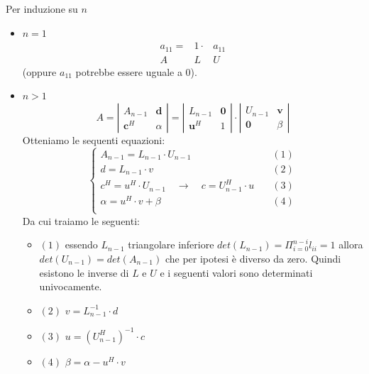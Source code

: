 \begin{thproof}
  Per induzione su $n$
  \begin{itemize}
  \item $n=1$\\
    \[\begin{array}{ccc}
      a_{11} = & 1 \cdot & a_{11} \\ 
      A        & L       & U
    \end{array}\]
    (oppure $a_{11}$ potrebbe essere uguale a $0$).
 \item $n>1$\\
\[
A = \left |
\begin{array}{c|c}
A_{n-1} & \mathbf{d} \\ \hline
\mathbf{c}^{H} &  \alpha
\end{array}
\right | = \left |
\begin{array}{c|c}
L_{n-1} & \mathbf{0} \\ \hline
\mathbf{u}^{H} &  1
\end{array}
\right |
\cdot
\left |
\begin{array}{c|c}
U_{n-1} & \mathbf{v} \\ \hline
\mathbf{0}      & \beta
\end{array}
\right |
\]
Otteniamo le sequenti equazioni:
\[\left\{
  \begin{array}{ll}
    A_{n-1} = L_{n-1} \cdot U_{n-1} & (1) \\
    d = L_{n-1} \cdot v           & (2)  \\
    c^{H} = u^{H} \cdot U_{n-1} \quad \rightarrow \quad 
    c = U^{H}_{n-1} \cdot u \quad  & (3) \\
    \alpha = u^{H} \cdot v + \beta &(4) \\
  \end{array}
\right.\]
Da cui traiamo le seguenti:
\begin{itemize}
\item $(1)$ essendo $L_{n-1}$ triangolare inferiore $det(L_{n−1}) =
  \Pi_{i=0}^{n-i} l_{ii} = 1$ allora $det (U_{n-1}) = det(A_{n-1})$ che
  per ipotesi \`e diverso da zero. Quindi esistono le inverse di $L$ e $U$
  e i seguenti valori sono determinati univocamente.
\item $(2)$ $v = L^{-1}_{n-1} \cdot d$ 
\item $(3)$ $u = (U_{n-1}^{H})^{-1} \cdot c$
\item $(4)$ $\beta = \alpha - u^{H} \cdot v$ 
\end{itemize}
\end{itemize}
\end{thproof}

